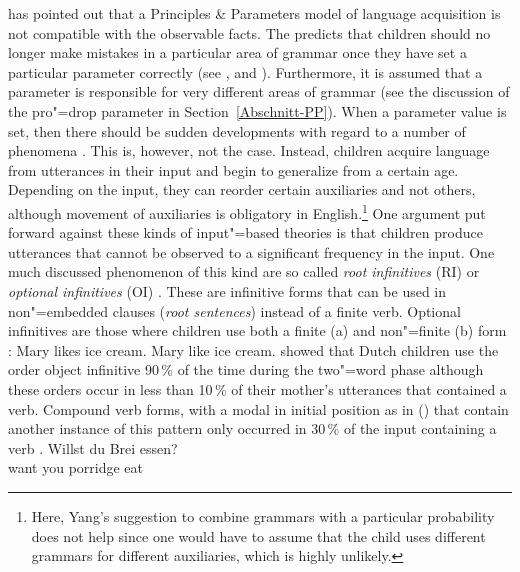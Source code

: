\citet{Tomasello2000a,Tomasello2003a} has pointed out that a Principles \& Parameters model of language acquisition
is not compatible with the observable facts. The \ppt predicts that children should no longer make mistakes in a particular area of grammar once they have set
a particular parameter correctly (see \citealp[]{Chomsky86a}, \citealp[--22]{Radford90a-u} and \citealp[]{Lightfoot97a}).
Furthermore, it is assumed that a parameter is responsible for very different areas of grammar (see the discussion of the pro"=drop parameter in
Section~\ref{Abschnitt-PP}). When a parameter value is set, then there should be sudden developments with regard to a number
of phenomena \citep[]{Lightfoot97a}. This is, however, not the case. Instead, children acquire language from utterances in their input
and begin to generalize from a certain age. Depending on the input, they can reorder certain auxiliaries and not others, although
movement of auxiliaries is obligatory in English.\footnote{%
	Here, Yang's suggestion to combine grammars with a particular probability does not help since one
	would have to assume that the child uses different grammars for different auxiliaries, which
        is highly unlikely.
}
One argument put forward against these kinds of input"=based theories is that children produce utterances that cannot be observed
to a significant frequency in the input. One much discussed phenomenon of this kind are so called \emph{root infinitives} (RI) or \emph{optional
  infinitives} (OI) \citep{Wexler98a}. These are infinitive forms that can be used in non"=embedded clauses (\emph{root sentences})
instead of a finite verb. Optional infinitives are those where children use both a finite (a) and non"=finite (b) form \citep[]{Wexler98a}:
\eal
\ex Mary likes ice cream.
\ex Mary like ice cream.
\zl
\citet*[]{WKG2001a} showed that Dutch children use the order object infinitive 90\,\% of the time during the two"=word phase although
these orders occur in less than 10\,\% of their mother's utterances that contained a verb.
Compound verb forms, \eg with a modal in initial position as in () that contain another instance of this pattern only occurred in 30\,\% of the input containing
a verb \citep*[]{WKG2001a}.
\ea
\gll Willst du Brei essen?\\
     want   you porridge eat\\
